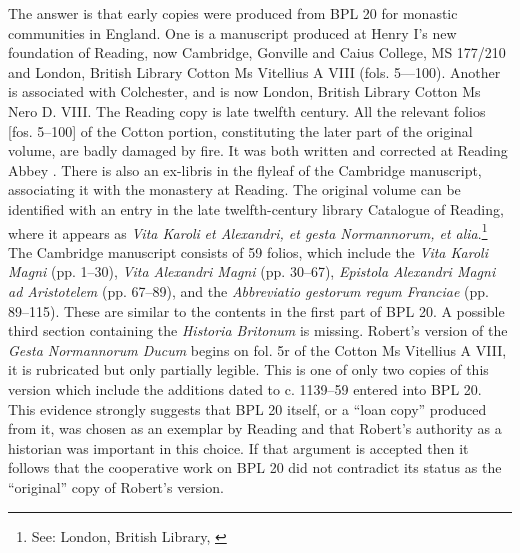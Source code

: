 \begin{paper}
The answer is that early copies were produced from BPL 20 for monastic
communities in England. One is a manuscript produced at Henry I's new
foundation of Reading, now Cambridge, Gonville and Caius College, MS
177/210 and London, British Library Cotton Ms Vitellius A VIII (fols.
5---100). Another is associated with Colchester, and is now London,
British Library Cotton Ms Nero D. VIII. The Reading copy is late twelfth
century. All the relevant folios {[}fos. 5--100{]} of the Cotton portion,
constituting the later part of the original volume, are badly damaged by
fire. It was both written and corrected at Reading Abbey \citep[154]{coates_english_1999}. There is also an ex-libris in the flyleaf of the Cambridge
manuscript, associating it with the monastery at Reading. The original
volume can be identified with an entry in the late twelfth-century
library Catalogue of Reading, where it appears as \emph{Vita Karoli}
\emph{et Alexandri, et gesta Normannorum, et alia}.\footnote{See:
  London, British Library, \cite[fol. 9v]{noauthor_reading_nodate}} The Cambridge
manuscript consists of 59 folios, which include the \emph{Vita Karoli
Magni} (pp. 1--30), \emph{Vita Alexandri Magni} (pp. 30--67),
\emph{Epistola Alexandri Magni ad Aristotelem} (pp. 67--89), and the
\emph{Abbreviatio gestorum regum Franciae} (pp. 89--115). These are
similar to the contents in the first part of BPL 20. A possible third
section containing the \emph{Historia Britonum} is missing. Robert's
version of the \emph{Gesta Normannorum Ducum} begins on fol. 5r of the
Cotton Ms Vitellius A VIII, it is rubricated but only partially legible.
This is one of only two copies of this version which include the
additions dated to c. 1139--59 entered into BPL 20. This evidence
strongly suggests that BPL 20 itself, or a ``loan copy'' produced from it,
was chosen as an exemplar by Reading and that Robert's authority as a
historian was important in this choice. If that argument is accepted
then it follows that the cooperative work on BPL 20 did not contradict
its status as the ``original'' copy of Robert's version.


\end{paper}
